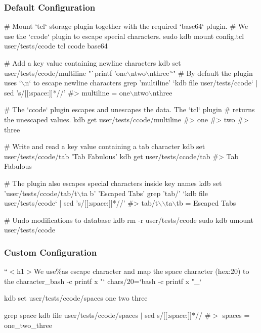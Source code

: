 \subsubsection*{Default Configuration}


\begin{DoxyCode}
# Mount `tcl` storage plugin together with the required `base64` plugin.
# We use the `ccode` plugin to escape special characters.
sudo kdb mount config.tcl user/tests/ccode tcl ccode base64

# Add a key value containing newline characters
kdb set user/tests/ccode/multiline "`printf 'one\(\backslash\)ntwo\(\backslash\)nthree'`"
# By default the plugin uses `\(\backslash\)n` to escape newline characters
grep 'multiline' `kdb file user/tests/ccode` | sed 's/[[:space:]]*//'
#> multiline = one\(\backslash\)ntwo\(\backslash\)nthree

# The `ccode` plugin escapes and unescapes the data. The `tcl` plugin
# returns the unescaped values.
kdb get user/tests/ccode/multiline
#> one
#> two
#> three

# Write and read a key value containing a tab character
kdb set user/tests/ccode/tab 'Tab       Fabulous'
kdb get user/tests/ccode/tab
#> Tab  Fabulous

# The plugin also escapes special characters inside key names
kdb set 'user/tests/ccode/tab/t\(\backslash\)ta      b' 'Escaped Tabs'
grep 'tab/' `kdb file user/tests/ccode` | sed 's/[[:space:]]*//'
#> tab/t\(\backslash\)\(\backslash\)ta\(\backslash\)tb = Escaped Tabs

# Undo modifications to database
kdb rm -r user/tests/ccode
sudo kdb umount user/tests/ccode
\end{DoxyCode}


\subsubsection*{Custom Configuration}

``{\ttfamily  $<$h1$>$We use}\%{\ttfamily as escape character and map the space character (hex\+:}20{\ttfamily ) to the character}\+\_bash -\/c \textquotesingle{}printf x "\textquotesingle{}` chars/20=`bash -\/c \textquotesingle{}printf x "\+\_\+\textquotesingle{}`

kdb set user/tests/ccode/spaces \textquotesingle{}one two three\textquotesingle{}

grep \textquotesingle{}space\textquotesingle{} {\ttfamily kdb file user/tests/ccode/spaces} $\vert$ sed \textquotesingle{}s/\mbox{[}\mbox{[}\+:space\+:\mbox{]}\mbox{]}$\ast$//\textquotesingle{} \#$>$ spaces = one\+\_\+two\+\_\+three

